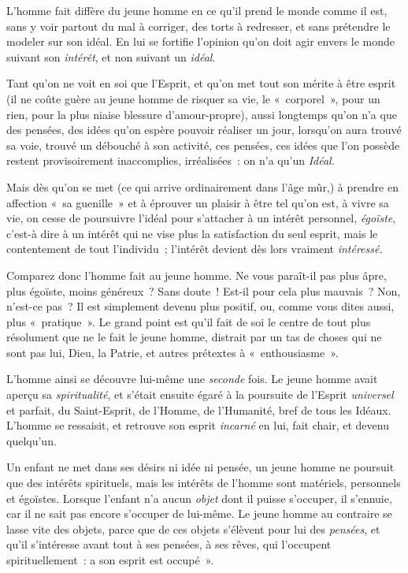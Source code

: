 \documentclass[french,twoside]{book} %
\begin{document}
L’homme fait diffère du jeune homme en ce qu’il prend le monde comme il est, sans y voir partout du mal à corriger, des torts à redresser, et sans prétendre le modeler sur son idéal. En lui se fortifie l’opinion qu’on doit agir envers le monde suivant son \emph{intérêt}, et non suivant un \emph{idéal}.\par
Tant qu’on ne voit en soi que l’Esprit, et qu’on met tout son mérite à être esprit (il ne coûte guère au jeune homme de risquer sa vie, le « corporel », pour un rien, pour la plus niaise blessure d’amour-propre), aussi longtemps qu’on n’a que des pensées, des idées qu’on espère pouvoir réaliser un jour, lorsqu’on aura trouvé sa voie, trouvé un débouché à son activité, ces pensées, ces idées que l’on possède restent provisoirement inaccomplies, irréalisées : on n’a qu’un \emph{Idéal.}\par
Mais dès qu’on se met (ce qui arrive ordinairement dans l’âge mûr,) à prendre en affection « sa guenille » et à éprouver un plaisir à être tel qu’on est, à vivre sa vie, on cesse de poursuivre l’idéal pour s’attacher à un intérêt personnel, \emph{égoïste}, c’est-à dire à un intérêt qui ne vise plus la satisfaction du seul esprit, mais le contentement de tout l’individu ; l’intérêt devient dès lors vraiment \emph{intéressé.}\par
Comparez donc l’homme fait au jeune homme. Ne vous paraît-il pas plus âpre, plus égoïste, moins généreux ? Sans doute ! Est-il pour cela plus mauvais ? Non, n’est-ce pas ? Il est simplement devenu plus positif, ou, comme vous dites aussi, plus « pratique ». Le grand point est qu’il fait de soi le centre de tout plus résolument que ne le fait le jeune homme, distrait par un tas de choses qui ne sont pas lui, Dieu, la Patrie, et autres prétextes à « enthousiasme ».\par
L’homme ainsi se découvre lui-même une \emph{seconde}  fois. Le jeune homme avait aperçu sa \emph{spiritualité}, et s’était ensuite égaré à la poursuite de l’Esprit \emph{universel} et parfait, du Saint-Esprit, de l’Homme, de l’Humanité, bref de tous les Idéaux. L’homme se ressaisit, et retrouve son esprit \emph{incarné} en lui, fait chair, et devenu quelqu’un.\par
Un enfant ne met dans ses désirs ni idée ni pensée, un jeune homme ne poursuit que des intérêts spirituels, mais les intérêts de l’homme sont matériels, personnels et égoïstes. Lorsque l’enfant n’a aucun \emph{objet} dont il puisse s’occuper, il s’ennuie, car il ne sait pas encore s’occuper de lui-même. Le jeune homme au contraire se lasse vite des objets, parce que de ces objets s’élèvent pour lui des \emph{pensées}, et qu’il s’intéresse avant tout à ses pensées, à ses rêves, qui l’occupent spirituellement : a son esprit est occupé ».\par
\end{document}
